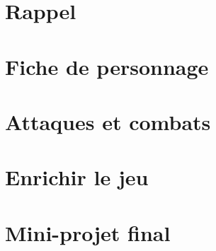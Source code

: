 

\section*{Rappel}

\section{Fiche de personnage}

\section{Attaques et combats}

\section{Enrichir le jeu}

\section{Mini-projet final}
